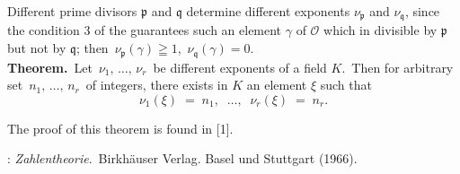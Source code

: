 \documentclass[12pt]{article}
\theoremstyle{definition}
\begin{document}
Different prime divisors $\mathfrak{p}$ and $\mathfrak{q}$ determine different exponents $\nu_{\mathfrak{p}}$ and $\nu_{\mathfrak{q}}$, since the condition 3 of the  guarantees such an element $\gamma$ of $\mathcal{O}$ which in divisible by $\mathfrak{p}$ but not by $\mathfrak{q}$; then\, $\nu_{\mathfrak{p}}(\gamma) \geqq 1$,\, $\nu_{\mathfrak{q}}(\gamma) = 0$.\\


\textbf{Theorem.}\, Let\, $\nu_1,\,\ldots,\,\nu_r$\, be different exponents of a field $K$.\, Then for arbitrary set \,$n_1,\,\ldots,\,n_r$\, of integers, there exists in $K$ an element $\xi$ such that
$$\nu_1(\xi) \;=\; n_1,\;\;\ldots,\;\;\nu_r(\xi) \;=\; n_r.$$

The proof of this theorem is found in [1].

\begin{thebibliography}{9}
: {\em Zahlentheorie}.\, Birkh\"auser Verlag. Basel und Stuttgart (1966).
\end{thebibliography}
\end{document}
